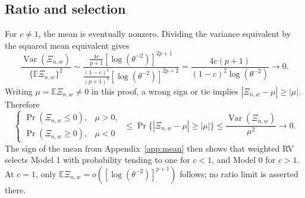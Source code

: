 \documentclass[11pt]{article}
\theoremstyle{definition}
\begin{document}
\subsection{Ratio and selection}\label{app:ratio}
For $c\ne1$, the mean is eventually nonzero. Dividing the
variance equivalent by the squared mean equivalent gives
\[
\frac{\operatorname{Var}(\Xi_{n,w})}{\{\mathbb E\Xi_{n,w}\}^2}
\sim
\frac{\frac{4c}{p+1}[\log(\theta^{-2})]^{2p+1}}
{\frac{(1-c)^2}{(p+1)^2}[\log(\theta^{-2})]^{2p+2}}
=\frac{4c(p+1)}{(1-c)^2\log(\theta^{-2})}\to0.
\]
Writing $\mu=\mathbb E\Xi_{n,w}\ne0$ in this proof, a wrong sign or
tie implies $|\Xi_{n,w}-\mu|\ge|\mu|$. Therefore
\[
\begin{cases}
\Pr(\Xi_{n,w}\le0),&\mu>0,\\
\Pr(\Xi_{n,w}\ge0),&\mu<0
\end{cases}
\ \le\Pr\{|\Xi_{n,w}-\mu|\ge|\mu|\}
\le\frac{\operatorname{Var}(\Xi_{n,w})}{\mu^2}\to0.
\]
The sign of the mean from Appendix~\ref{app:mean} then shows that weighted
RV selects Model 1 with probability tending to one for $c<1$,
and Model 0 for $c>1$. At $c=1$, only
$\mathbb E\Xi_{n,w}=o([\log(\theta^{-2})]^{p+1})$ follows;
no ratio limit is asserted there.
\end{document}
